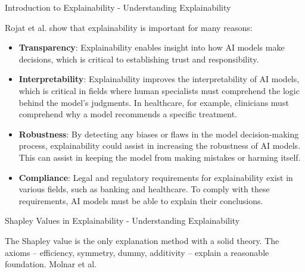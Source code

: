 \documentclass[aspectratio=169]{beamer}
\begin{document}
\begin{frame}{Introduction to Explainability - Understanding Explainability}

Rojat et al. \cite{DBLP:journals/corr/abs-2104-00950} show that explainability is important for many reasons:

    \begin{itemize}
        \item \textbf{Transparency}:
        Explainability enables insight into how \ac{AI} models make decisions, which is critical to establishing trust and responsibility.
        \item \textbf{Interpretability}:
        Explainability improves the interpretability of \ac{AI} models, which is critical in fields where human specialists must comprehend the logic behind the model's judgments. In healthcare, for example, clinicians must comprehend why a model recommends a specific treatment.
        \item \textbf{Robustness}:
        By detecting any biases or flaws in the model decision-making process, explainability could assist in increasing the robustness of \ac{AI} models. This can assist in keeping the model from making mistakes or harming itself.
        \item \textbf{Compliance}:
        Legal and regulatory requirements for explainability exist in various fields, such as banking and healthcare. To comply with these requirements, \ac{AI} models must be able to explain their conclusions.
    \end{itemize}

\end{frame}

\begin{frame}{Shapley Values in Explainability - Understanding Explainability}

The Shapley value is the only explanation method with a solid theory. The axioms – efficiency, symmetry, dummy, additivity – explain a reasonable foundation. Molnar et al. \cite{molnar2022}

\end{frame}
\end{document}
